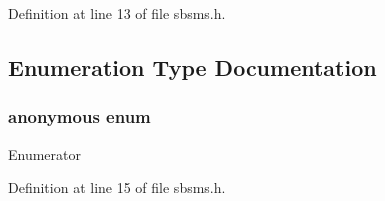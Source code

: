 Definition at line 13 of file sbsms.\+h.



\subsection{Enumeration Type Documentation}
\subsubsection[{\texorpdfstring{anonymous enum}{anonymous enum}}]{\setlength{\rightskip}{0pt plus 5cm}anonymous enum}\hypertarget{namespace__sbsms___aaa516460bd9d3c383bcfcb40a48a1927}{}\label{namespace__sbsms___aaa516460bd9d3c383bcfcb40a48a1927}
\begin{Desc}
\item[Enumerator]\par
\begin{description}
\item[{\em 
max\+Bands\hypertarget{namespace__sbsms___aaa516460bd9d3c383bcfcb40a48a1927a94c27d17dd5dcbd2a58d6b9631e0b887}{}\label{namespace__sbsms___aaa516460bd9d3c383bcfcb40a48a1927a94c27d17dd5dcbd2a58d6b9631e0b887}
}]\item[{\em 
num\+Quality\+Params\hypertarget{namespace__sbsms___aaa516460bd9d3c383bcfcb40a48a1927a29eaac429fafe4b80e64d0a61d389f8d}{}\label{namespace__sbsms___aaa516460bd9d3c383bcfcb40a48a1927a29eaac429fafe4b80e64d0a61d389f8d}
}]\end{description}
\end{Desc}


Definition at line 15 of file sbsms.\+h.

